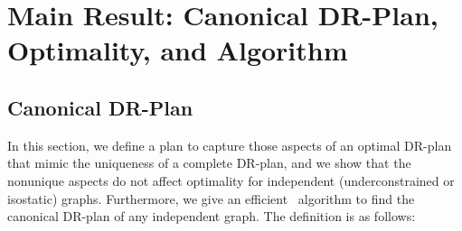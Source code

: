 \section{Main Result: Canonical DR-Plan, Optimality, and Algorithm}
\label{sec:DRP}



\subsection{Canonical DR-Plan}
In this section, we define a  plan to capture those aspects of an optimal DR-plan that mimic the  uniqueness of a complete DR-plan, and we show that the nonunique aspects do not affect optimality for independent (underconstrained or isostatic) graphs. Furthermore, we give an efficient \ComplexityCanDRP\ algorithm to find the canonical DR-plan of any independent graph. The definition is as follows:



